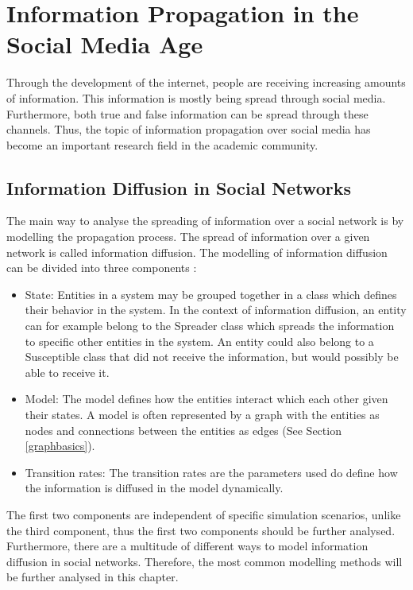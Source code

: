 \section{Information Propagation in the Social Media Age}
\label{informationdiffsection}
Through the development of the internet, 
people are receiving increasing amounts of information.
This information is mostly being spread through social media.
Furthermore, both true and false information can be spread through 
these channels.
Thus, the topic of information propagation over social media has become an 
important research field in the academic community.

\subsection{Information Diffusion in Social Networks}

The main way to analyse the spreading of information over a social network 
is by modelling the propagation process. The spread of information over 
a given network is called information diffusion. 
The modelling of information diffusion can be divided into three components
\cite{reviewinformationdiffusion}: 

\begin{itemize}
    \item State: Entities in a system may be grouped together in a class which
    defines their behavior in the system. In the context of information diffusion,
    an entity can for example belong to the  \glqq Spreader \grqq{} class which spreads the information
    to specific other entities in the system. An entity could also belong to a
    \glqq Susceptible \grqq{} class that did not receive the information, 
    but would possibly be able to receive it.
    \item Model: The model defines how the entities interact which each other
    given their states. A model is often represented by a graph with the entities
    as nodes and connections between the entities as edges 
    (See Section \ref{graphbasics}).
    \item Transition rates: The transition rates are the parameters used
    do define how the information is diffused in the model dynamically. 
\end{itemize}

The first two components are independent of specific simulation scenarios,
unlike the third component, thus the first two components should be further
analysed. Furthermore, there are a multitude of different ways 
to model information diffusion in social networks. Therefore, the most common
modelling methods will be further analysed in this chapter.

